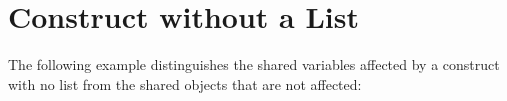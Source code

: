 \pagebreak
\section{ Construct without a List}
\label{sec:flush_nolist}

The following example distinguishes the shared variables affected by a  
construct with no list from the shared objects that are not affected:




